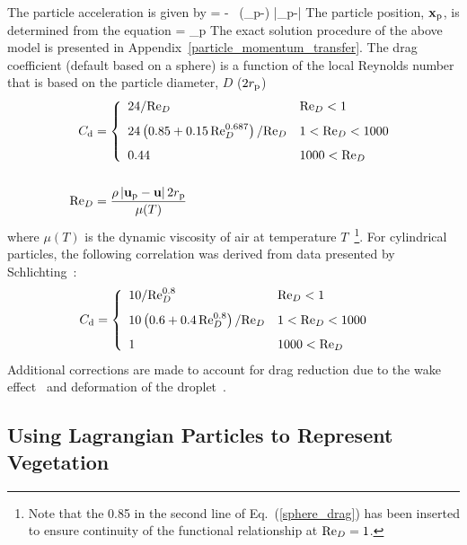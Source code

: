 The particle acceleration is given by
\be
     = \bg - \ha {} \,
    (\bu_{\rm p}-\bu) |\bu_{\rm p}-\bu|
    \label{part_accel}
\ee
The particle position, ${\mathbf{x}}_{\rm p}$, is determined from the equation
\be
     = \bu_{\rm p}
\ee
The exact solution procedure of the above model is presented in Appendix~\ref{particle_momentum_transfer}. The drag coefficient (default based on a sphere) is a function of the local Reynolds number that is based on the particle diameter, $D$ ($2 r_{\rm p}$)
\begin{align}
 C_{\rm d} &= \left\{ \begin{array}{ll}
     24/\hbox{Re}_D                                          & \hbox{Re}_D < 1    \\[0.1in]
     24\left(0.85+0.15 \, \hbox{Re}_D^{0.687} \right)/\hbox{Re}_D  & 1 < \hbox{Re}_D < 1000 \label{sphere_drag}\\[0.1in]
     0.44                                              & 1000 < \hbox{Re}_D
     \end{array} \right.  \\[0.2in]
\hbox{Re}_D &= \frac{\rho \, |{\mathbf{u}}_{\rm p}-{\mathbf{u}}| \, 2 r_{\rm p}}{\mu(T)} \end{align}
where $\mu(T)$ is the dynamic viscosity of air at temperature $T$~\cite{Crowe:1}\footnote{Note that the 0.85 in the second line of Eq.~(\ref{sphere_drag}) has been inserted to ensure continuity of the functional relationship at $\hbox{Re}_D=1$.}. For cylindrical particles, the following correlation was derived from data presented by Schlichting~\cite{Schlichting:1}:
\begin{align}
 C_{\rm d} &= \left\{ \begin{array}{ll}
     10/\hbox{Re}_D^{0.8}                                & \hbox{Re}_D < 1    \\[0.1in]
     10\left(0.6+0.4 \, \hbox{Re}_D^{0.8} \right)/\hbox{Re}_D  & 1 < \hbox{Re}_D < 1000 \\[0.1in]
     1                                             & 1000 < \hbox{Re}_D
     \end{array} \right.
\end{align}
Additional corrections are made to account for drag reduction due to the wake effect~\cite{Ramirez:1} and deformation of the droplet~\cite{Loth:1}.


\subsection{Using Lagrangian Particles to Represent Vegetation}

